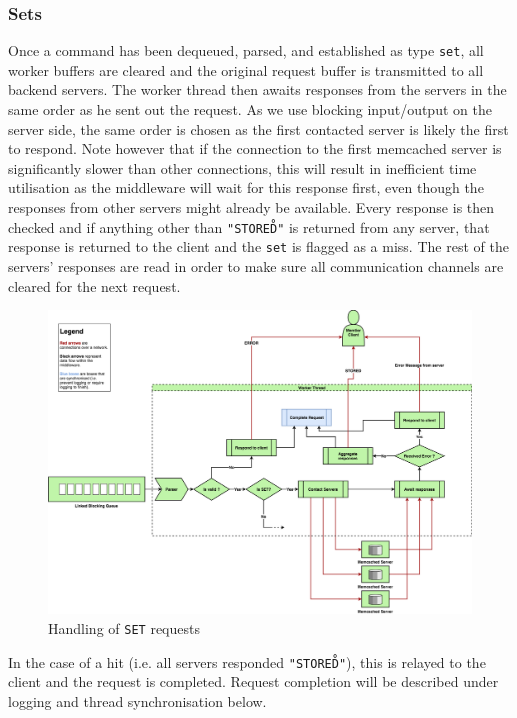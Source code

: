 \documentclass[11pt,a4paper]{article}
\begin{document}
\subsubsection{Sets}
Once a command has been dequeued, parsed, and established as type \texttt{set}, all worker buffers are cleared and the original request buffer is transmitted to all backend servers. The worker thread then awaits responses from the servers in the same order as he sent out the request. As we use blocking input/output on the server side, the same order is chosen as the first contacted server is likely the first to respond. Note however that if the connection to the first memcached server is significantly slower than other connections, this will result in inefficient time utilisation as the middleware will wait for this response first, even though the responses from other servers might already be available. Every response is then checked and if anything other than \texttt{"STORED\r\n"} is returned from any server, that response is returned to the client and the \texttt{set} is flagged as a miss. The rest of the servers' responses are read in order to make sure all communication channels are cleared for the next request.
\begin{figure}[h]
    \centering
    \includegraphics[width=\textwidth]{processing/graphics/sets_handling.png}
    \caption{Handling of \texttt{SET} requests}
    \label{png::sets_handling}
\end{figure}
In the case of a hit (i.e. all servers responded \texttt{"STORED\r\n"}), this is relayed to the client and the request is completed. Request completion will be described under logging and thread synchronisation below.
\end{document}

